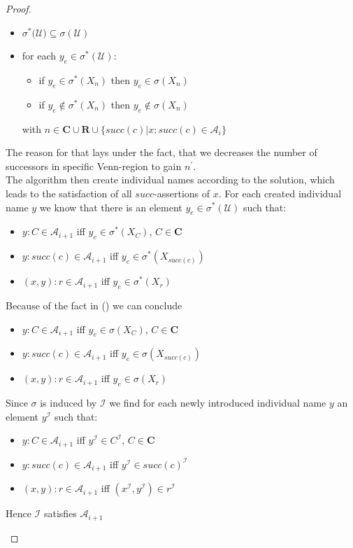 \documentclass{book}
\theoremstyle{break}
\theoremstyle{definition}
\begin{document}
\begin{proof}
\begin{itemize}
\begin{itemize}
\item $\sigma^\ast(\mathcal{U)}\subseteq\sigma(\mathcal{U})$
\item for each $y_e\in \sigma^\ast(\mathcal{U})$: 
\begin{itemize}
\item if $y_e\in \sigma^\ast(X_n)$ then $y_e\in\sigma(X_n)$
\item if $y_e\notin \sigma^\ast(X_n)$ then $y_e\notin\sigma(X_n)$
\end{itemize}
with $n\in\mathbf{C}\cup\mathbf{R}\cup\{succ(c)|x:succ(c)\in \mathcal{A}_i\}$
\end{itemize}
The reason for that lays under the fact, that we decreases the number of successors in specific Venn-region to gain $n^\prime$.\\
The algorithm then create individual names according to the solution, which leads to the satisfaction of all $succ$-assertions of $x$. For each created individual name $y$ we know that there is an element $y_e\in\sigma^\ast(\mathcal{U})$ such that:
\begin{itemize}
\item $y:C\in\mathcal{A}_{i+1}$ iff $y_e\in\sigma^\ast(X_C)$, $C\in\mathbf{C}$
\item $y:succ(c)\in\mathcal{A}_{i+1}$ iff $y_e\in\sigma^\ast(X_{succ(c)})$
\item $(x,y):r\in\mathcal{A}_{i+1}$ iff $y_e\in\sigma^\ast(X_r)$
\end{itemize}
Because of the fact in (\dag) we can conclude
\begin{itemize}
\item $y:C\in\mathcal{A}_{i+1}$ iff $y_e\in\sigma(X_C)$, $C\in\mathbf{C}$
\item $y:succ(c)\in\mathcal{A}_{i+1}$ iff $y_e\in\sigma(X_{succ(c)})$
\item $(x,y):r\in\mathcal{A}_{i+1}$ iff $y_e\in\sigma(X_r)$
\end{itemize}
Since $\sigma$ is induced by $\mathcal{I}$ we find for each newly introduced individual name $y$ an element $y^\mathcal{I}$ such that:
\begin{itemize}
\item $y:C\in\mathcal{A}_{i+1}$ iff $y^\mathcal{I}\in C^\mathcal{I}$, $C\in\mathbf{C}$
\item $y:succ(c)\in\mathcal{A}_{i+1}$ iff $y^\mathcal{I}\in succ(c)^\mathcal{I}$
\item $(x,y):r\in\mathcal{A}_{i+1}$ iff $(x^\mathcal{I},y^\mathcal{I})\in r^\mathcal{I}$
\end{itemize}
Hence $\mathcal{I}$ satisfies $\mathcal{A}_{i+1}$
\end{itemize}
\end{proof}
\normalem


\end{document}
